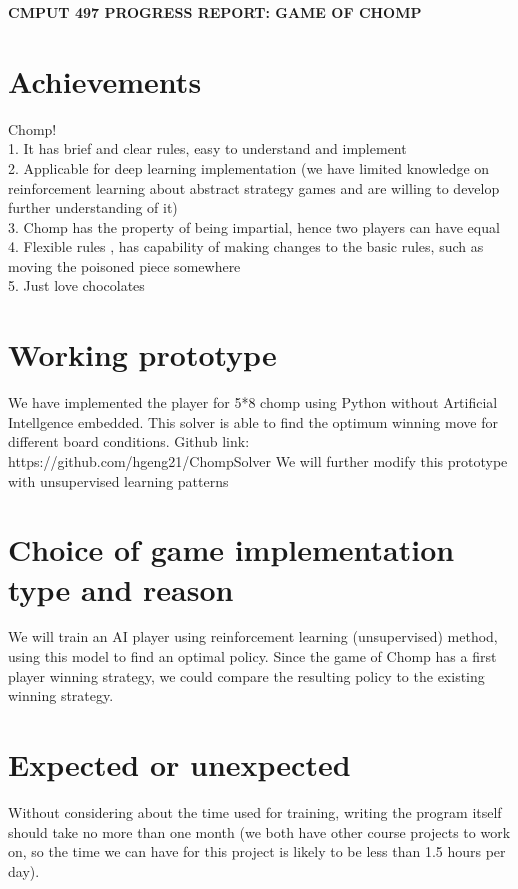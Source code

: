 \documentclass[11pt,oneside,letterpaper]{article}
\begin{document}
\pagestyle{empty}

\begin{center} 
\bfseries\uppercase{
CMPUT 497 Progress report: game of chomp
}
\end{center}

\section{Achievements}

Chomp!\\
1. It has brief and clear rules, easy to understand and implement\\
2. Applicable for deep learning implementation (we have limited knowledge on reinforcement learning about abstract strategy games and are willing to develop further understanding of it)\\
3. Chomp has the property of being impartial, hence two players can have equal \\
4. Flexible rules , has capability of making changes to the basic rules, such as moving the poisoned piece somewhere\\
5. Just love chocolates

\section{Working prototype}
We have implemented the player for 5*8 chomp using Python without Artificial Intellgence embedded. This solver is able to find the optimum winning move for different board conditions.
Github link: https://github.com/hgeng21/ChompSolver
We will further modify this prototype with unsupervised learning patterns


\section{Choice of game implementation type and reason}
We will train an AI player using reinforcement learning (unsupervised) method, using this model to find an optimal policy. Since the game of Chomp has a first player winning strategy, we could compare the resulting policy to the existing winning strategy. 

\section{Expected or unexpected}
Without considering about the time used for training, writing the program itself should take no more than one month (we both have other course projects to work on, so the time we can have for this project is likely to be less than 1.5 hours per day).
\end{document}

